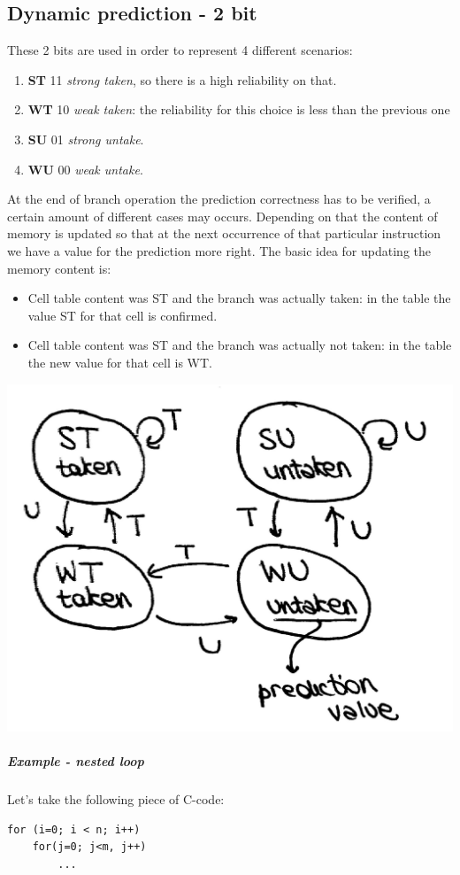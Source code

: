 \subsection{Dynamic prediction - 2 bit}
These 2 bits are used in order to represent 4 different scenarios:
\begin{enumerate}
  \item \textbf{ST} 11 \textit{strong taken}, so there is a high reliability
    on that.
  \item \textbf{WT} 10 \textit{weak taken}: the reliability for this choice
    is less than the previous one
  \item \textbf{SU} 01 \textit{strong untake}.
  \item \textbf{WU} 00 \textit{weak untake}.
\end{enumerate}
At the end of branch operation the prediction correctness has to be verified, a
certain amount of different cases may occurs. Depending on that the content of
memory is updated so that at the next occurrence of that particular instruction
we have a value for the prediction more right. The basic idea for updating the
memory content is:
\begin{itemize}
  \item Cell table content was ST and the branch was actually taken: in the
    table the value ST for that cell is confirmed.
  \item Cell table content was ST and the branch was actually not taken: in
    the table the new value for that cell is WT.
\end{itemize}
\begin{center}
  \includegraphics[width=0.6\linewidth]{img/img3/17}
\end{center}
\subparagraph{Example - nested loop}
Let's take the following piece of C-code:
\begin{verbatim}
for (i=0; i < n; i++)
    for(j=0; j<m, j++)
        ...
\end{verbatim}

